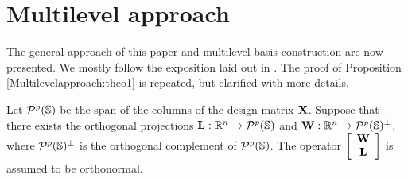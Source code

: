 \documentclass[11pt,final]{amsart}       %
\begin{document}






\section{Multilevel approach}
\label{multilevelapproach}

The general approach of this paper and multilevel basis construction
are now presented. We mostly follow the exposition laid out in
\cite{Castrillon2015}. The proof of Proposition
\ref{Multilevelapproach:theo1} is repeated, but clarified with
more details.

Let ${\mathcal P}^{p}(\mathbb{S})$ be the span of the columns of the design matrix
$\mathbf{X}$. Suppose that there exists the orthogonal projections $\mathbf{L} :
\Bbb{R}^n \rightarrow {\mathcal P}^{p}(\mathbb{S})$ and $\mathbf{W} : \Bbb{R}^n \rightarrow
{\mathcal P}^{p}(\mathbb{S})^{\perp}$, where ${\mathcal P}^{p}(\mathbb{S})^{\perp}$ is the
orthogonal complement of ${\mathcal P}^{p}(\mathbb{S})$.  The operator $\left[
\begin{array}{c}
\mathbf{W} \\
\mathbf{L}
\end{array}
\right ]$ is assumed to be orthonormal.
\end{document}
